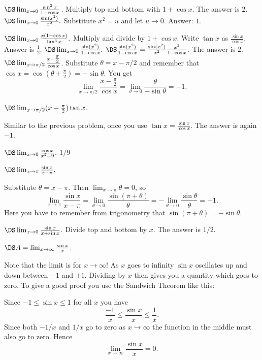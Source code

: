 \begin{multicols}{3}
\problem $\DS \lim_{x\to0}\frac{\sin^2 x}{1-\cos x}$.
\answer
Multiply top and bottom with $1+\cos x$.  The answer is $2$.
\endanswer
\problem $\DS \lim_{x\to0}\frac{\sin(x^2)}{x^2}.$
\answer
Substitute $x^2 = u$ and let $u\to 0$.  Answer: $1$.
\endanswer

\problem $\DS \lim_{x\to 0} \frac{x(1-\cos x)}{ \tan^3 x}.$
\answer
Multiply and divide by $1+\cos x$.  Write $\tan x$ as $\frac{\sin x}{\cos x}$.
Answer is $\frac12$. 
\endanswer
\problem $\DS \lim_{x\to 0} \frac{\sin(x^2)}{ 1-\cos x}. $
\answer
$\DS  \frac{\sin(x^2)}{ 1-\cos x} = \frac{\sin (x^2)}{x^2} \frac{x^2}{1-\cos x}$.  The answer is $2$.
\endanswer
\problem \(\DS\lim_{x\to\pi/2}\frac{x-\tfrac\pi2}{\cos x}\).
\answer
Substitute \(\theta = x-\pi/2\) and remember that \(\cos x = \cos(\theta+\frac\pi2) = -\sin\theta\).  You get
\[
\lim_{x\to\pi/2}\frac{x-\tfrac\pi2}{\cos x} =\lim_{\theta\to0}
\frac{\theta}{-\sin\theta} = -1.
\]
\endanswer

\problem \(\DS\lim_{x\to\pi/2}(x-\tfrac\pi2)\tan x\).

\answer
Similar to the previous problem, once you use \(\tan x = \frac{\sin
  x}{\cos x}\). The answer is again \(-1\).
\endanswer

\problem $\DS \lim_{x\to 0}\frac{\cos x}{x^2+9}.$
\answer
$1/9$
\endanswer

\problem $\DS \lim_{x\to \pi}\frac{\sin x}{x-\pi}.$

\answer
Substitute \(\theta = x-\pi\).  Then \(\lim_{x\to\pi}\theta=0\), so
\[
\lim_{x\to \pi}\frac{\sin x}{x-\pi} = \lim_{\theta\to0}
\frac{\sin(\pi+\theta)}{\theta} = -\lim_{\theta\to0}
\frac{\sin\theta}{\theta} = -1.
\]
Here you have to remember from trigonometry that \(\sin(\pi+\theta)
= -\sin\theta\).
\endanswer

\problem $\DS \lim_{x\rightarrow 0}\frac{\sin x}{x+\sin x}.$
\answer
Divide top and bottom by $x$.  The answer is $1/2$.
\endanswer

\problem \carefulnow $\DS A = \lim_{x\to\infty} \frac{\sin x}{x}$.

\answer
Note that the limit is for \(x\to\infty\)!  As \(x\) goes to
infinity \(\sin x\) oscillates up and down between \(-1\) and
\(+1\).  Dividing by \(x\) then gives you a quantity which goes to
zero.  To give a good proof you use the Sandwich Theorem like this:
\smallskip

Since \(-1\le \sin x\le 1\) for all \(x\) you have
\[
\frac{-1}{x} \le \frac{\sin x}{x} \le \frac{1}{x}.
\]
Since both \(-1/x\) and \(1/x\) go to zero as \(x\to\infty\) the
function in the middle must also go to zero.  Hence
\[
\lim_{x\to\infty} \frac{\sin x}{x} = 0.
\]
\endanswer


\end{multicols}
